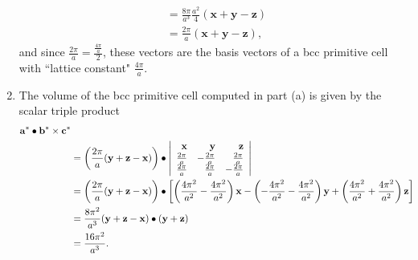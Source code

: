 \documentclass{article}
\begin{document}
\begin{enumerate}
{\begin{align*}
                            &= \frac{8 \pi}{a^3} \frac{a^2}{4} 
                               (\mathbf{x} + \mathbf{y} - \mathbf{z}) \\
                            &= \frac{2 \pi}{a}(\mathbf{x} + \mathbf{y} - \mathbf{z}),
        \end{align*}
        and since $\frac{2\pi}{a} = \frac{\frac{4\pi}{a}}{2}$, these vectors
        are the basis vectors of a bcc primitive cell with ``lattice constant"
        $\frac{4\pi}{a}$.
       }
       \item{
         The volume of the bcc primitive cell computed in part (a) is given by
         the scalar triple product
         \begin{align*}
         \mathbf{a}^{\ast} \bullet \mathbf{b}^{\ast} \times \mathbf{c}^{\ast} \\
         &= \left(\frac{2\pi}{a}(\mathbf{y} + \mathbf{z} - \mathbf{x})\right) \bullet 
            \left|\begin{array}{r r r}
            \mathbf{x}     &  \mathbf{y}     &  \mathbf{z}     \\
            \frac{2\pi}{a} & -\frac{2\pi}{a} &  \frac{2\pi}{a} \\
            \frac{2\pi}{a} &  \frac{2\pi}{a} & -\frac{2\pi}{a} \\
            \end{array}\right| \\
         &= \left(\frac{2\pi}{a}(\mathbf{y} + \mathbf{z} - \mathbf{x})\right) \bullet
            \left[\left(\frac{4\pi^2}{a^2} - \frac{4 \pi^2}{a^2}\right)\mathbf{x}
                - \left(-\frac{4\pi^2}{a^2} - \frac{4 \pi^2}{a^2}\right)\mathbf{y}
                + \left(\frac{4\pi^2}{a^2} + \frac{4 \pi^2}{a^2}\right)\mathbf{z}\right] \\
         &= \frac{8 \pi^{2}}{a^3}(\mathbf{y} + \mathbf{z} - \mathbf{x}) \bullet
                            (\mathbf{y} + \mathbf{z}) \\
         &= \frac{16 \pi^{2}}{a^3}.
         \end{align*}
       }
\end{enumerate}

\pagebreak 
\end{document}
